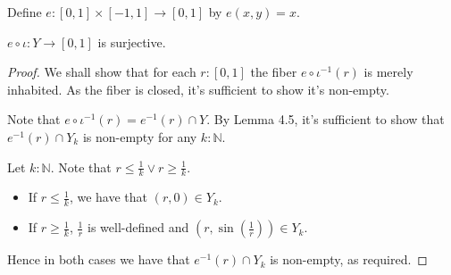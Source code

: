\documentclass{../util/zariski}
\begin{document}
\begin{definition}
  Define $e : [0,1]\times [-1,1] \to [0,1]$ by $e(x,y) = x$. 
\end{definition}  

\begin{lemma}
  $e\circ \iota : Y \to [0,1]$ is surjective.  
\end{lemma}
\begin{proof}
  We shall show that for each $r:[0,1]$ the fiber $e\circ \iota^{-1}(r)$ is merely inhabited. 
  As the fiber is closed, it's sufficient to show it's non-empty. 

  Note that $e\circ \iota^{-1}(r)= e^{-1}(r) \cap Y$. 
  By Lemma 4.5, it's sufficient to show that $e^{-1}(r) \cap Y_k$ is non-empty for any $k:\mathbb N$. 

  Let $k:\mathbb N$. 
  Note that $r\leq \frac1k \vee r \geq \frac 1k$. 
  \begin{itemize}
    \item If $r\leq \frac1k$, we have that $(r,0) \in Y_k$. 
    \item If $r\geq \frac1k$, $\frac1r$ is well-defined and 
      $(r,\sin(\frac1r)) \in Y_k$. 
  \end{itemize}
  Hence in both cases we have that $e^{-1}(r) \cap Y_k$ is non-empty, as required. 
\end{proof}
\end{document}
